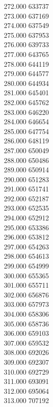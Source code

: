 { 272.000	633737 \\
 273.000	637169 \\
 274.000	637549 \\
 275.000	637953 \\
 276.000	639733 \\
 277.000	643765 \\
 278.000	644119 \\
 279.000	644577 \\
 280.000	644934 \\
 281.000	645401 \\
 282.000	645762 \\
 283.000	646220 \\
 284.000	646654 \\
 285.000	647754 \\
 286.000	648119 \\
 287.000	650049 \\
 288.000	650486 \\
 289.000	650914 \\
 290.000	651283 \\
 291.000	651741 \\
 292.000	652187 \\
 293.000	652535 \\
 294.000	652912 \\
 295.000	653386 \\
 296.000	653812 \\
 297.000	654263 \\
 298.000	654613 \\
 299.000	654999 \\
 300.000	655365 \\
 301.000	655711 \\
 302.000	656876 \\
 303.000	657973 \\
 304.000	658306 \\
 305.000	658736 \\
 306.000	659103 \\
 307.000	659532 \\
 308.000	692026 \\
 309.000	692307 \\
 310.000	692729 \\
 311.000	693091 \\
 312.000	695064 \\
 313.000	707192 \\
}
